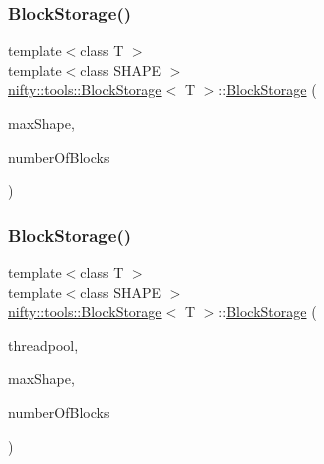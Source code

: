 \subsubsection{\texorpdfstring{Block\+Storage()}{BlockStorage()}\hspace{0.1cm}{\footnotesize\ttfamily [1/2]}}
{\footnotesize\ttfamily template$<$class T $>$ \\
template$<$class S\+H\+A\+PE $>$ \\
\hyperlink{classnifty_1_1tools_1_1BlockStorage}{nifty\+::tools\+::\+Block\+Storage}$<$ T $>$\+::\hyperlink{classnifty_1_1tools_1_1BlockStorage}{Block\+Storage} (\begin{DoxyParamCaption}\item[{const S\+H\+A\+PE \&}]{max\+Shape,  }\item[{const std\+::size\+\_\+t}]{number\+Of\+Blocks }\end{DoxyParamCaption})\hspace{0.3cm}{\ttfamily [inline]}}

\mbox{\label{classnifty_1_1tools_1_1BlockStorage_a536abc42caab3d50becdfbadd2d58f89}} 
\subsubsection{\texorpdfstring{Block\+Storage()}{BlockStorage()}\hspace{0.1cm}{\footnotesize\ttfamily [2/2]}}
{\footnotesize\ttfamily template$<$class T $>$ \\
template$<$class S\+H\+A\+PE $>$ \\
\hyperlink{classnifty_1_1tools_1_1BlockStorage}{nifty\+::tools\+::\+Block\+Storage}$<$ T $>$\+::\hyperlink{classnifty_1_1tools_1_1BlockStorage}{Block\+Storage} (\begin{DoxyParamCaption}\item[{\hyperlink{classnifty_1_1parallel_1_1ThreadPool}{nifty\+::parallel\+::\+Thread\+Pool} \&}]{threadpool,  }\item[{const S\+H\+A\+PE \&}]{max\+Shape,  }\item[{const std\+::size\+\_\+t}]{number\+Of\+Blocks }\end{DoxyParamCaption})\hspace{0.3cm}{\ttfamily [inline]}}



